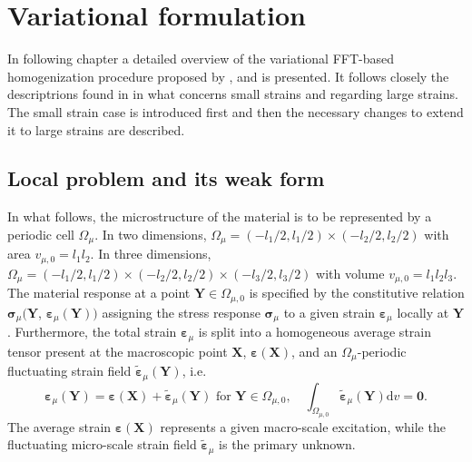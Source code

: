 \chapter{Variational formulation}

In following chapter a detailed overview of the variational FFT-based homogenization procedure proposed by \cite{vondrejc_fft-based_2014}, \cite{zeman_finite_2017} and \cite{de_geus_finite_2017} is presented.
It follows closely the descriptrions found in \cite{zeman_finite_2017} in what concerns small strains and \cite{de_geus_finite_2017} regarding large strains.
The small strain case is introduced first and then the necessary changes to extend it to large strains are described.


\section{Local problem and its weak form}

In what follows, the microstructure of the material is to be represented by a periodic cell \(\Omega_\mu\). In two dimensions, \(\Omega_\mu=\left(-l_{1} / 2, l_{1} / 2\right) \times\left(-l_{2} / 2, l_{2} / 2\right)\) with area \(v_{\mu,0}=l_{1} l_{2}\).
In three dimensions, \(\Omega_\mu=\left(-l_{1} / 2, l_{1} / 2\right) \times\left(-l_{2} / 2, l_{2} / 2\right)\times\left(-l_{3} / 2, l_{3} / 2\right)\) with volume \(v_{\mu,0}=l_{1} l_{2} l_{3}\).
The material response at a point \(\bm Y \in \Omega_{\mu,0}\) is specified by the constitutive relation \(\bm{\sigma}_\mu(\bm{Y}\), \(\bm\varepsilon_\mu(\bm{Y}))\) assigning the stress response \(\bm{\sigma}_\mu\) to a given strain \(\bm\varepsilon_\mu\) locally at \(\bm Y\).
Furthermore, the total strain \(\bm \varepsilon_\mu\) is split into a homogeneous average strain tensor present at the macroscopic point \(\bm X\), \(\bm \varepsilon(\bm X)\), and an \(\Omega_\mu\)-periodic fluctuating strain field \(\tilde{\bm \varepsilon}_\mu(\bm Y)\), i.e.
\begin{equation}
\bm\varepsilon_\mu(\bm{Y})=\bm \varepsilon(\bm X)+\tilde{\bm \varepsilon}_\mu(\bm{Y}) \text { for } \bm Y \in \Omega_{\mu,0}, \quad \int_{\Omega_{\mu,0} } \tilde{\bm\varepsilon}_\mu(\bm{Y}) \mathrm{d} v=\bm{0}.
\end{equation}
The average strain \(\bm \varepsilon(\bm X)\) represents a given macro-scale excitation, while the fluctuating micro-scale strain field \(\tilde{\bm\varepsilon}_\mu\) is the primary unknown.

